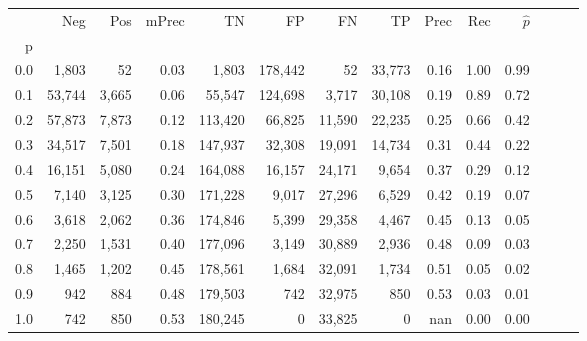 \begin{tabular}{rrrrrrrrrrrrrr}
\toprule
{} &     Neg &    Pos & mPrec &       TN &       FP &      FN &      TP &  Prec &   Rec & $\hat{p}$ \\
p   &         &        &       &          &          &         &         &       &       &           \\
\midrule
0.0 &   1,803 &     52 &  0.03 &    1,803 &  178,442 &      52 &  33,773 &  0.16 &  1.00 &      0.99 \\
0.1 &  53,744 &  3,665 &  0.06 &   55,547 &  124,698 &   3,717 &  30,108 &  0.19 &  0.89 &      0.72 \\
0.2 &  57,873 &  7,873 &  0.12 &  113,420 &   66,825 &  11,590 &  22,235 &  0.25 &  0.66 &      0.42 \\
0.3 &  34,517 &  7,501 &  0.18 &  147,937 &   32,308 &  19,091 &  14,734 &  0.31 &  0.44 &      0.22 \\
0.4 &  16,151 &  5,080 &  0.24 &  164,088 &   16,157 &  24,171 &   9,654 &  0.37 &  0.29 &      0.12 \\
0.5 &   7,140 &  3,125 &  0.30 &  171,228 &    9,017 &  27,296 &   6,529 &  0.42 &  0.19 &      0.07 \\
0.6 &   3,618 &  2,062 &  0.36 &  174,846 &    5,399 &  29,358 &   4,467 &  0.45 &  0.13 &      0.05 \\
0.7 &   2,250 &  1,531 &  0.40 &  177,096 &    3,149 &  30,889 &   2,936 &  0.48 &  0.09 &      0.03 \\
0.8 &   1,465 &  1,202 &  0.45 &  178,561 &    1,684 &  32,091 &   1,734 &  0.51 &  0.05 &      0.02 \\
0.9 &     942 &    884 &  0.48 &  179,503 &      742 &  32,975 &     850 &  0.53 &  0.03 &      0.01 \\
1.0 &     742 &    850 &  0.53 &  180,245 &        0 &  33,825 &       0 &   nan &  0.00 &      0.00 \\
\bottomrule
\end{tabular}
